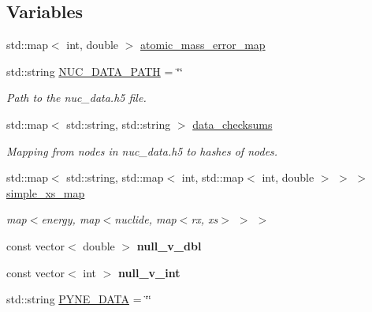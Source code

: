 \subsection*{Variables}
\begin{DoxyCompactItemize}
\item 
std\+::map$<$ int, double $>$ \hyperlink{namespacepyne_a70711189f1078e2ebc132db9ce7ab0a7}{atomic\+\_\+mass\+\_\+error\+\_\+map}
\item 
\mbox{\label{namespacepyne_ac4b3b3dcf295d033b906bf921d820ae2}} 
std\+::string \hyperlink{namespacepyne_ac4b3b3dcf295d033b906bf921d820ae2}{N\+U\+C\+\_\+\+D\+A\+T\+A\+\_\+\+P\+A\+TH} = \char`\"{}\char`\"{}
\begin{DoxyCompactList}\small\item\em Path to the nuc\+\_\+data.\+h5 file. \end{DoxyCompactList}\item 
std\+::map$<$ std\+::string, std\+::string $>$ \hyperlink{namespacepyne_a092bde815498a51a7532e3021a63ede5}{data\+\_\+checksums}
\begin{DoxyCompactList}\small\item\em Mapping from nodes in nuc\+\_\+data.\+h5 to hashes of nodes. \end{DoxyCompactList}\item 
\mbox{\label{namespacepyne_a75b3d385906d5d2f078a6d099629a5c8}} 
std\+::map$<$ std\+::string, std\+::map$<$ int, std\+::map$<$ int, double $>$ $>$ $>$ \hyperlink{namespacepyne_a75b3d385906d5d2f078a6d099629a5c8}{simple\+\_\+xs\+\_\+map}
\begin{DoxyCompactList}\small\item\em map$<$energy, map$<$nuclide, map$<$rx, xs$>$ $>$ $>$ \end{DoxyCompactList}\item 
\mbox{\label{namespacepyne_a6d2e20b389686b95d7e8207c957e755a}} 
const vector$<$ double $>$ {\bfseries null\+\_\+v\+\_\+dbl}
\item 
\mbox{\label{namespacepyne_aafb4c1cfb275a35448c6db6dd7596344}} 
const vector$<$ int $>$ {\bfseries null\+\_\+v\+\_\+int}
\item 
\mbox{\label{namespacepyne_a7927bda45ba222dccef6e43a373b76a6}} 
std\+::string \hyperlink{namespacepyne_a7927bda45ba222dccef6e43a373b76a6}{P\+Y\+N\+E\+\_\+\+D\+A\+TA} = \char`\"{}\char`\"{}

\end{DoxyCompactItemize}

